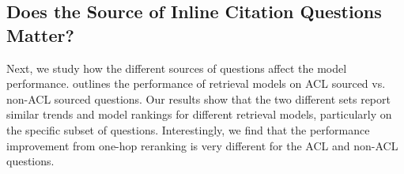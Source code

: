 \begin{table}[t]
    \centering
    \small
    \caption{Comparison of retrieval performance on the ACL vs. non-ACL sourced \inlineq{} questions. Results show that the performance improvement from one-hop reranking over BM25 is subtantially higher for ACL sourced questions.}
    \label{table:acl_vs_nonacl}
\end{table}

\subsection{Does the Source of Inline Citation Questions Matter?}
\label{sec:inlinequestion_acl}

Next, we study how the different sources of \inlineq{} questions
affect the model performance.  outlines the performance of retrieval models on ACL sourced vs. non-ACL sourced \inlineq{} questions. 
Our results show that the two different sets report similar trends and model rankings for different retrieval models, particularly on the specific subset of questions. Interestingly, we find that the performance improvement from one-hop reranking is very different for the ACL and non-ACL questions. 

